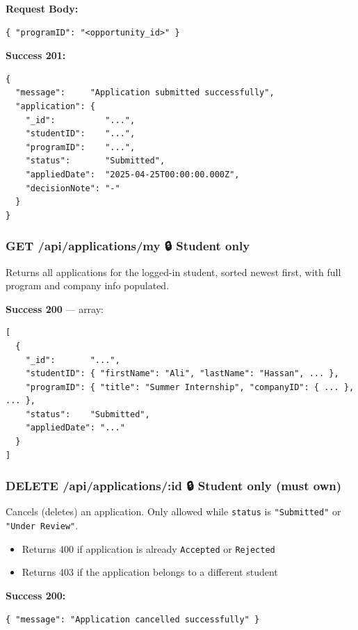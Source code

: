 \documentclass[12pt,a4paper]{article}
\begin{document}
\textbf{Request Body:}
\begin{lstlisting}[language={}]
{ "programID": "<opportunity_id>" }
\end{lstlisting}

\textbf{Success 201:}
\begin{lstlisting}[language={}]
{
  "message":     "Application submitted successfully",
  "application": {
    "_id":          "...",
    "studentID":    "...",
    "programID":    "...",
    "status":       "Submitted",
    "appliedDate":  "2025-04-25T00:00:00.000Z",
    "decisionNote": "-"
  }
}
\end{lstlisting}

\vspace{0.5cm}

\subsubsection*{GET /api/applications/my \quad 🔒 Student only}

Returns all applications for the logged-in student, sorted newest first, with full program and company info populated.

\textbf{Success 200} — array:
\begin{lstlisting}[language={}]
[
  {
    "_id":       "...",
    "studentID": { "firstName": "Ali", "lastName": "Hassan", ... },
    "programID": { "title": "Summer Internship", "companyID": { ... }, ... },
    "status":    "Submitted",
    "appliedDate": "..."
  }
]
\end{lstlisting}

\vspace{0.5cm}

\subsubsection*{DELETE /api/applications/:id \quad 🔒 Student only (must own)}

Cancels (deletes) an application. Only allowed while \texttt{status} is \texttt{"Submitted"} or \texttt{"Under Review"}.

\begin{itemize}[leftmargin=1.5cm]
  \item Returns 400 if application is already \texttt{Accepted} or \texttt{Rejected}
  \item Returns 403 if the application belongs to a different student
\end{itemize}

\textbf{Success 200:}
\begin{lstlisting}[language={}]
{ "message": "Application cancelled successfully" }
\end{lstlisting}
\end{document}
